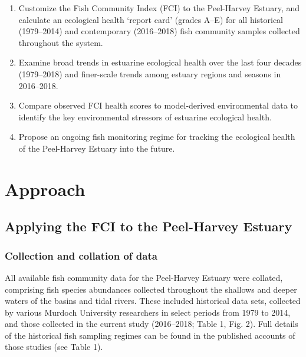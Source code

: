 \documentclass[
]{book}
\begin{document}
\begin{enumerate}
\def\labelenumi{\arabic{enumi}.}
\item
  Customize the Fish Community Index (FCI) to the Peel-Harvey Estuary, and calculate an ecological health `report card' (grades A--E) for all historical (1979--2014) and contemporary (2016--2018) fish community samples collected throughout the system.
\item
  Examine broad trends in estuarine ecological health over the last four decades (1979--2018) and finer-scale trends among estuary regions and seasons in 2016--2018.
\item
  Compare observed FCI health scores to model-derived environmental data to identify the key environmental stressors of estuarine ecological health.
\item
  Propose an ongoing fish monitoring regime for tracking the ecological health of the Peel-Harvey Estuary into the future.
\end{enumerate}

\hypertarget{approach-1}{%
\section{Approach}\label{approach-1}}

\hypertarget{applying-the-fci-to-the-peel-harvey-estuary}{%
\subsection{Applying the FCI to the Peel-Harvey Estuary}\label{applying-the-fci-to-the-peel-harvey-estuary}}

\hypertarget{collection-and-collation-of-data}{%
\subsubsection{Collection and collation of data}\label{collection-and-collation-of-data}}

All available fish community data for the Peel-Harvey Estuary were collated, comprising fish species abundances collected throughout the shallows and deeper waters of the basins and tidal rivers. These included historical data sets, collected by various Murdoch University researchers in select periods from 1979 to 2014, and those collected in the current study (2016--2018; Table 1, Fig. 2). Full details of the historical fish sampling regimes can be found in the published accounts of those studies (see Table 1).~
\end{document}
